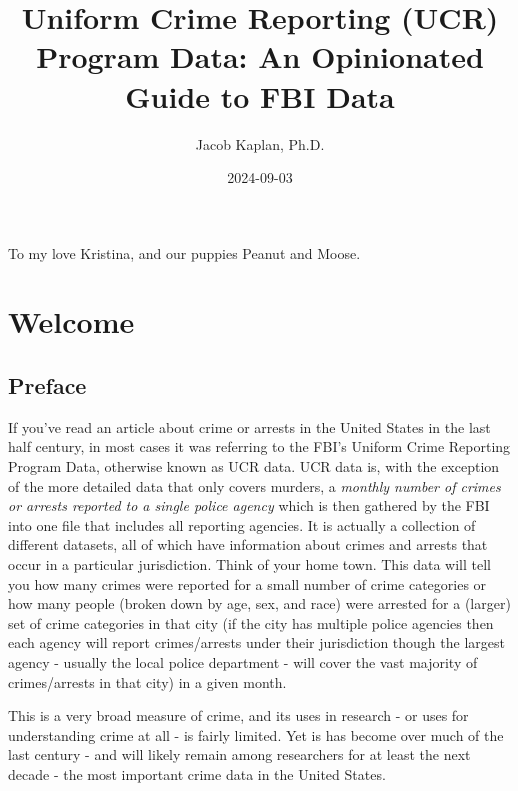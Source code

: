 \documentclass[
]{krantz}
\title{Uniform Crime Reporting (UCR) Program Data: An
Opinionated Guide to FBI Data}
\author{Jacob Kaplan, Ph.D.}
\date{2024-09-03}
\begin{document}
\maketitle

\thispagestyle{empty}
\begin{center}
To my love Kristina, and our puppies Peanut and Moose.
\end{center}

\setlength{\abovedisplayskip}{-5pt}
\setlength{\abovedisplayshortskip}{-5pt}

{
\hypersetup{linkcolor=}
\setcounter{tocdepth}{2}
\tableofcontents
}
\mainmatter

\part{Welcome}\label{part-welcome}

\chapter{Preface}\label{preface}

If you've read an article about crime or arrests in the
United States in the last half century, in most cases it was
referring to the FBI's Uniform Crime Reporting Program Data,
otherwise known as UCR data. UCR data is, with the exception
of the more detailed data that only covers murders, a
\emph{monthly number of crimes or arrests reported to a
single police agency} which is then gathered by the FBI into
one file that includes all reporting agencies. It is
actually a collection of different datasets, all of which
have information about crimes and arrests that occur in a
particular jurisdiction. Think of your home town. This data
will tell you how many crimes were reported for a small
number of crime categories or how many people (broken down
by age, sex, and race) were arrested for a (larger) set of
crime categories in that city (if the city has multiple
police agencies then each agency will report crimes/arrests
under their jurisdiction though the largest agency - usually
the local police department - will cover the vast majority
of crimes/arrests in that city) in a given month.

This is a very broad measure of crime, and its uses in
research - or uses for understanding crime at all - is
fairly limited. Yet is has become over much of the last
century - and will likely remain among researchers for at
least the next decade - the most important crime data in the
United States.
\end{document}

